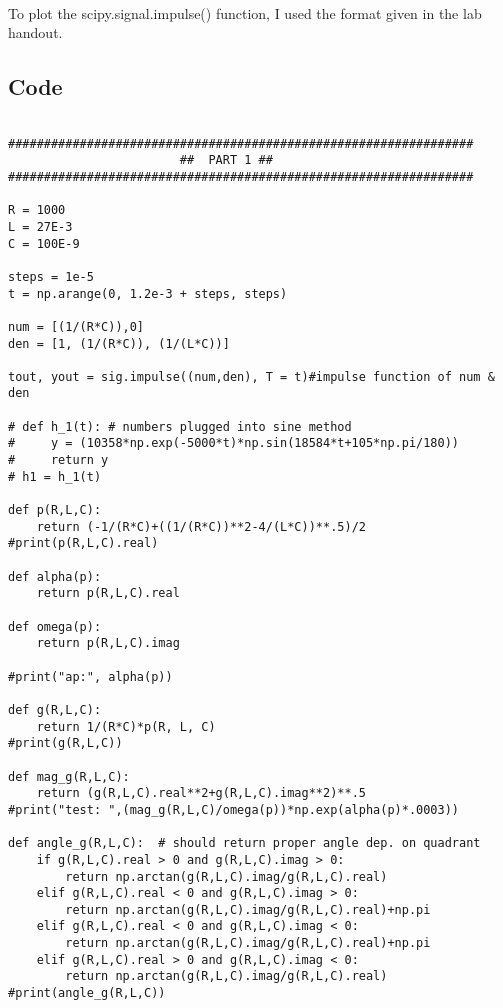 \paragraph{}
To plot the scipy.signal.impulse() function, I used the format given in the lab handout.

\subsection{Code}
\begin{scriptsize}
\begin{lstlisting}

#################################################################
                        ##  PART 1 ##
#################################################################

R = 1000
L = 27E-3
C = 100E-9

steps = 1e-5
t = np.arange(0, 1.2e-3 + steps, steps) 

num = [(1/(R*C)),0]
den = [1, (1/(R*C)), (1/(L*C))]

tout, yout = sig.impulse((num,den), T = t)#impulse function of num & den 

# def h_1(t): # numbers plugged into sine method
#     y = (10358*np.exp(-5000*t)*np.sin(18584*t+105*np.pi/180))
#     return y
# h1 = h_1(t)

def p(R,L,C):
    return (-1/(R*C)+((1/(R*C))**2-4/(L*C))**.5)/2
#print(p(R,L,C).real)

def alpha(p):
    return p(R,L,C).real

def omega(p):
    return p(R,L,C).imag

#print("ap:", alpha(p)) 

def g(R,L,C):
    return 1/(R*C)*p(R, L, C)
#print(g(R,L,C))    

def mag_g(R,L,C):
    return (g(R,L,C).real**2+g(R,L,C).imag**2)**.5                
#print("test: ",(mag_g(R,L,C)/omega(p))*np.exp(alpha(p)*.0003))

def angle_g(R,L,C):  # should return proper angle dep. on quadrant
    if g(R,L,C).real > 0 and g(R,L,C).imag > 0:
        return np.arctan(g(R,L,C).imag/g(R,L,C).real)
    elif g(R,L,C).real < 0 and g(R,L,C).imag > 0:
        return np.arctan(g(R,L,C).imag/g(R,L,C).real)+np.pi
    elif g(R,L,C).real < 0 and g(R,L,C).imag < 0:
        return np.arctan(g(R,L,C).imag/g(R,L,C).real)+np.pi
    elif g(R,L,C).real > 0 and g(R,L,C).imag < 0:
        return np.arctan(g(R,L,C).imag/g(R,L,C).real)
#print(angle_g(R,L,C))


\end{lstlisting}
\end{scriptsize}
